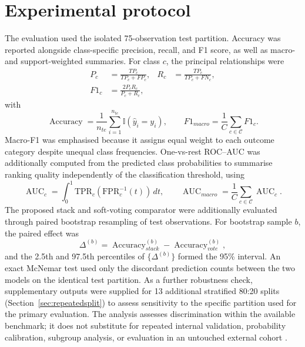 \documentclass[a4paper,fleqn]{cas-dc}
\begin{document}
\section{Experimental protocol}
\label{sec:protocol}
The evaluation used the isolated 75-observation test partition. Accuracy was reported alongside class-specific precision, recall, and F1 score, as well as macro- and support-weighted summaries. For class $c$, the principal relationships were
\\
\begin{equation}
\begin{aligned}
P_c&=\frac{TP_c}{TP_c+FP_c}, &
R_c&=\frac{TP_c}{TP_c+FN_c},\\
F1_c&=\frac{2P_cR_c}{P_c+R_c},
\end{aligned}
\label{eq:classmetrics}
\end{equation}
with
\begin{equation}
\operatorname{Accuracy}=\frac{1}{n_{te}}\sum_{i=1}^{n_{te}}\mathbb{I}(\hat y_i=y_i),
\qquad
F1_{macro}=\frac{1}{C}\sum_{c\in\mathcal{C}}F1_c.
\label{eq:aggregatemetrics}
\end{equation}
Macro-F1 was emphasised because it assigns equal weight to each outcome category despite unequal class frequencies. One-vs-rest ROC--AUC was additionally computed from the predicted class probabilities to summarise ranking quality independently of the classification threshold, using
\begin{equation}
\operatorname{AUC}_c=\int_0^1 \mathrm{TPR}_c(\mathrm{FPR}_c^{-1}(t))\,dt,
\qquad
\operatorname{AUC}_{macro}=\frac{1}{C}\sum_{c\in\mathcal{C}}\operatorname{AUC}_c.
\label{eq:auc}
\end{equation}
The proposed stack and soft-voting comparator were additionally evaluated through paired bootstrap resampling of test observations. For bootstrap sample $b$, the paired effect was
\begin{equation}
\Delta^{(b)}=\operatorname{Accuracy}^{(b)}_{stack}
-\operatorname{Accuracy}^{(b)}_{vote},
\label{eq:bootstrap}
\end{equation}
and the 2.5th and 97.5th percentiles of $\{\Delta^{(b)}\}$ formed the 95\% interval. An exact McNemar test used only the discordant prediction counts between the two models on the identical test partition. As a further robustness check, supplementary outputs were supplied for 13 additional stratified 80:20 splits (Section~\ref{sec:repeatedsplit}) to assess sensitivity to the specific partition used for the primary evaluation. The analysis assesses discrimination within the available benchmark; it does not substitute for repeated internal validation, probability calibration, subgroup analysis, or evaluation in an untouched external cohort \cite{collins2024,riley2024,rileysample2024}.
\end{document}
